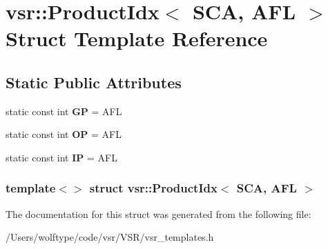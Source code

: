 \hypertarget{structvsr_1_1_product_idx_3_01_s_c_a_00_01_a_f_l_01_4}{\section{vsr\-:\-:Product\-Idx$<$ S\-C\-A, A\-F\-L $>$ Struct Template Reference}
\label{structvsr_1_1_product_idx_3_01_s_c_a_00_01_a_f_l_01_4}
}
\subsection*{Static Public Attributes}
\begin{DoxyCompactItemize}
\item 
\hypertarget{structvsr_1_1_product_idx_3_01_s_c_a_00_01_a_f_l_01_4_a175cc6199be556f79cbcbe99b4dfe21e}{static const int {\bfseries G\-P} = A\-F\-L}\label{structvsr_1_1_product_idx_3_01_s_c_a_00_01_a_f_l_01_4_a175cc6199be556f79cbcbe99b4dfe21e}

\item 
\hypertarget{structvsr_1_1_product_idx_3_01_s_c_a_00_01_a_f_l_01_4_a493416d9179b1111f87907bf3900b645}{static const int {\bfseries O\-P} = A\-F\-L}\label{structvsr_1_1_product_idx_3_01_s_c_a_00_01_a_f_l_01_4_a493416d9179b1111f87907bf3900b645}

\item 
\hypertarget{structvsr_1_1_product_idx_3_01_s_c_a_00_01_a_f_l_01_4_a5d319c9f37a8ed2489bf946b2a72dddd}{static const int {\bfseries I\-P} = A\-F\-L}\label{structvsr_1_1_product_idx_3_01_s_c_a_00_01_a_f_l_01_4_a5d319c9f37a8ed2489bf946b2a72dddd}

\end{DoxyCompactItemize}
\subsubsection*{template$<$$>$ struct vsr\-::\-Product\-Idx$<$ S\-C\-A, A\-F\-L $>$}



The documentation for this struct was generated from the following file\-:\begin{DoxyCompactItemize}
\item 
/\-Users/wolftype/code/vsr/\-V\-S\-R/vsr\-\_\-templates.\-h\end{DoxyCompactItemize}

